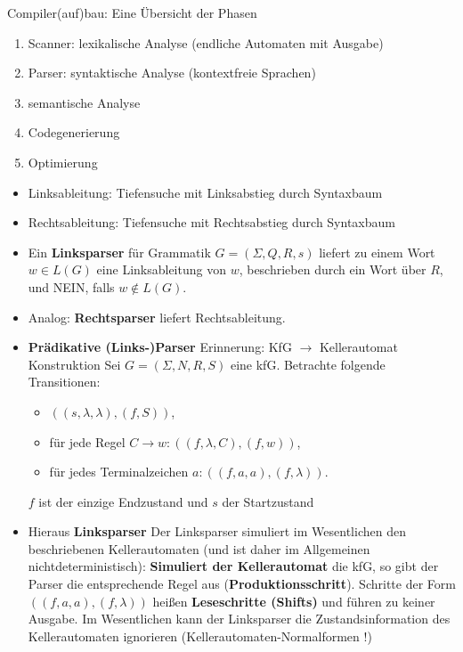 \documentclass[12pt, a4paper]{article}
\begin{document}
	Compiler(auf)bau: Eine Übersicht der Phasen
	\begin{enumerate}
		\item Scanner: lexikalische Analyse (endliche Automaten mit Ausgabe)
		\item Parser: syntaktische Analyse (kontextfreie Sprachen)
		\item semantische Analyse
		\item Codegenerierung
		\item Optimierung
	\end{enumerate}

	\begin{itemize}
		\subsubsection{Parsing}
		\item Linksableitung: Tiefensuche mit Linksabstieg durch Syntaxbaum
		
		\item Rechtsableitung: Tiefensuche mit Rechtsabstieg durch Syntaxbaum
		
		\item Ein \textbf{Linksparser} für Grammatik $G = (\Sigma,Q,R,s)$ liefert zu einem Wort $w\in L(G)$ eine Linksableitung von $w$, beschrieben durch ein Wort über $R$, und NEIN, falls $w\notin L(G)$.
		
		\item Analog: \textbf{Rechtsparser} liefert Rechtsableitung.
		
		
		\item \textbf{Prädikative (Links-)Parser}
			\subitem Erinnerung: KfG $\rightarrow$ Kellerautomat Konstruktion
			\subitem Sei $G = (\Sigma, N, R, S)$ eine kfG. Betrachte folgende Transitionen:
			\begin{itemize}
				\item $((s, \lambda, \lambda), (f, S))$,
				\item für jede Regel $C\rightarrow w: ((f, \lambda, C), (f, w))$,
				\item für jedes Terminalzeichen $a: ((f, a, a), (f, \lambda))$.
			\end{itemize}
			\subitem $f$ ist der einzige Endzustand und $s$ der Startzustand
			
		\item Hieraus \textbf{Linksparser}
			\subitem Der Linksparser simuliert im Wesentlichen den beschriebenen Kellerautomaten
		(und ist daher im Allgemeinen nichtdeterministisch):
			\subitem \textbf{Simuliert der Kellerautomat} die kfG, so gibt der Parser die entsprechende Regel aus (\textbf{Produktionsschritt}).
			\subitem Schritte der Form $((f, a, a), (f, \lambda))$ heißen \textbf{Leseschritte (Shifts)} und führen zu keiner Ausgabe.
			\subitem Im Wesentlichen kann der Linksparser die Zustandsinformation des Kellerautomaten ignorieren (Kellerautomaten-Normalformen !)
			

\end{itemize}
\end{document}
